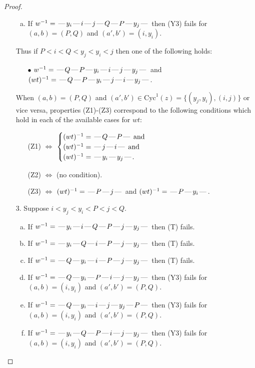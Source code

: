 \documentclass[10pt]{article}
\theoremstyle{definition}
\theoremstyle{definition}
\def\dash{\text{\hspace{0.5mm}---\hspace{0.5mm}}}
\def\Cyc{\mathrm{Cyc}}
\begin{document}
\begin{proof}
\begin{enumerate}
\begin{enumerate}[(a)]
\item If $w^{-1} = \dash y_i\dash i\dash j\dash Q\dash P\dash y_j\dash $ then (Y3) fails for $(a,b)=(P,Q)$ and $(a',b')=(i,y_i)$.
\end{enumerate}
Thus if $P < i < Q < y_j < y_i < j$ then one of the following holds:
\begin{enumerate}
\item[$\bullet$] $w^{-1} = \dash Q\dash P\dash y_i\dash i\dash j\dash y_j\dash $ and $(wt)^{-1} = \dash Q\dash P\dash y_i\dash j\dash i\dash y_j\dash $.
\end{enumerate}
When $(a,b)= (P,Q)$ and $(a',b')\in \Cyc^1(z)=\{(y_j,y_i),(i,j)\}$ or vice versa,
properties (Z1)-(Z3) correspond to the following conditions which
hold in each of the available cases for $wt$:
\begin{enumerate}
\item[](Z1) $\Leftrightarrow$ $\begin{cases}\text{$(wt)^{-1} = \dash Q \dash P \dash$}\text{ and }\\
\text{$(wt)^{-1} = \dash j \dash i \dash$}\text{ and }\\
\text{$(wt)^{-1} = \dash y_i \dash y_j \dash$}.\end{cases}$
\item[](Z2) $\Leftrightarrow$ (no condition).
\item[](Z3) $\Leftrightarrow$ $(wt)^{-1} = \dash P \dash j \dash$  and $(wt)^{-1} = \dash P \dash y_i \dash$.
\end{enumerate}
\item[$3$.] Suppose $i < y_j < y_i < P < j < Q$.
\begin{enumerate}[(a)]
\item If $w^{-1} = \dash y_i\dash i\dash Q\dash P\dash j\dash y_j\dash $ then (T) fails.
\item If $w^{-1} = \dash y_i\dash Q\dash i\dash P\dash j\dash y_j\dash $ then (T) fails.
\item If $w^{-1} = \dash Q\dash y_i\dash i\dash P\dash j\dash y_j\dash $ then (T) fails.
\item If $w^{-1} = \dash Q\dash y_i\dash P\dash i\dash j\dash y_j\dash $ then (Y3) fails for $(a,b)=(i,y_i)$ and $(a',b')=(P,Q)$.
\item If $w^{-1} = \dash Q\dash y_i\dash i\dash j\dash y_j\dash P\dash $ then (Y3) fails for $(a,b)=(i,y_i)$ and $(a',b')=(P,Q)$.
\item If $w^{-1} = \dash y_i\dash Q\dash P\dash i\dash j\dash y_j\dash $ then (Y3) fails for $(a,b)=(i,y_i)$ and $(a',b')=(P,Q)$.

\end{enumerate}
\end{enumerate}
\end{proof}
\end{document}
